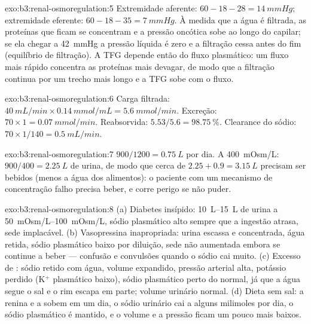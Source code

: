 \begin{solution}{exo:b3:renal-osmoregulation:5}
Extremidade aferente: $60 - 18 - 28 = \qty{14}{mmHg}$; extremidade
eferente: $60 - 18 -
35 = \qty{7}{mmHg}$. À medida que a água é filtrada,
as proteínas que ficam se concentram e a pressão oncótica sobe ao longo
do capilar; se ela chegar a \qty{42}{mmHg} a pressão líquida é zero e a
filtração cessa antes do fim (equilíbrio de filtração). A TFG depende
então do fluxo plasmático: um fluxo mais rápido concentra as proteínas
mais devagar, de modo que a filtração continua por um trecho mais longo
e a TFG sobe com o fluxo.
\end{solution}

\begin{solution}{exo:b3:renal-osmoregulation:6}
Carga filtrada: $\qty{40}{mL/min}\times\qty{0.14}{mmol/mL} =
\qty{5.6}{mmol/min}$. Excreção: $70\times 1 = \qty{0.07}{mmol/min}$.
Reabsorvida: $5.53/5.6 = \qty{98.75}{\%}$. Clearance do sódio: $70\times
1/140 = \qty{0.5}{mL/min}$.
\end{solution}

\begin{solution}{exo:b3:renal-osmoregulation:7}
$900/1200 = \qty{0.75}{L}$ por dia. A \qty{400}{mOsm/L}: $900/400 =
\qty{2.25}{L}$ de urina, de modo que cerca de $2.25 + 0.9 = \qty{3.15}{L}$ precisam ser bebidos (menos a água dos alimentos): o
paciente com um mecanismo de concentração falho precisa beber, e corre
perigo se não puder.
\end{solution}

\begin{solution}{exo:b3:renal-osmoregulation:8}
(a) Diabetes insípido: \qtyrange{10}{15}{L} de urina a
\qtyrange{50}{100}{mOsm/L}, sódio plasmático alto sempre que a ingestão
atrasa, sede implacável. (b) Vasopressina inapropriada: urina escassa e
concentrada, água retida, sódio plasmático baixo por diluição, sede não
aumentada embora se continue a beber --- confusão e convulsões quando o
sódio cai muito. (c) Excesso de : sódio retido com água,
volume expandido, pressão arterial alta, potássio perdido (K$^{+}$
plasmático baixo), sódio plasmático perto do normal, já que a água segue
o sal e o rim escapa em parte; volume urinário normal. (d) Dieta sem
sal: a renina e a  sobem em um dia, o sódio urinário cai a
alguns milimoles por dia, o sódio plasmático é mantido, e o volume e a
pressão ficam um pouco mais baixos.
\end{solution}

